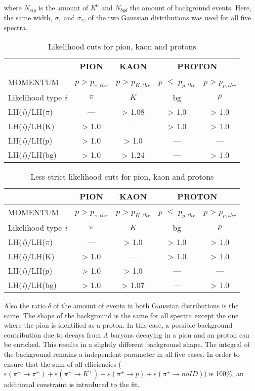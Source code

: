 where $N_{sig}$ is the amount of $K^0$ and $N_{bgd}$ the amount of background events. Here, the same width, $\sigma_1$ and $\sigma_2$, of the two Gaussian distributions
was used for all five spectra.

\begin{table}[h]
  \caption{\label{LHcut} Likelihood cuts for pion, kaon and protons}
  \centering
  \begin{tabular}{lcccc}
    \hline
     & PION & KAON & \multicolumn{2}{c}{PROTON} \\
    \hline
    MOMENTUM & $p$ > $p_{\pi,thr}$ & $p$ > $p_{K,thr}$ & $p$ $\leq$ $p_{p,thr}$ & $p$ > $p_{p,thr}$ \\
    Likelihood type \textit{i} & $\pi$ & $K$ & bg & $p$ \\
    LH(\textit{i})/LH($\pi$) & --- & > 1.08 & > 1.0 & > 1.0 \\
    LH(\textit{i})/LH(K) & > 1.0 & --- & > 1.0 & > 1.0 \\
    LH(\textit{i})/LH($p$) & > 1.0 & > 1.0 & --- & --- \\
    LH(\textit{i})/LH(bg) & > 1.0 & > 1.24 & --- & > 1.0 \\
    \hline
  \end{tabular}
\end{table}

\begin{table}[]
  \caption{\label{LHlessstrict} Less strict likelihood cuts for pion, kaon and protons}
  \centering
  \begin{tabular}{lcccc}
    \hline
     & PION & KAON & \multicolumn{2}{c}{PROTON} \\
    \hline
    MOMENTUM & $p$ > $p_{\pi,thr}$ & $p$ > $p_{K,thr}$ & $p$ $\leq$ $p_{p,thr}$ & $p$ > $p_{p,thr}$ \\
    Likelihood type \textit{i} & $\pi$ & $K$ & bg & $p$ \\
    LH(\textit{i})/LH($\pi$) & --- & > 1.0 & > 1.0 & > 1.0 \\
    LH(\textit{i})/LH(K) & > 1.0 & --- & > 1.0 & > 1.0 \\
    LH(\textit{i})/LH($p$) & > 1.0 & > 1.0 & --- & --- \\
    LH(\textit{i})/LH(bg) & > 1.0 & > 1.07 & --- & > 1.0 \\
    \hline
  \end{tabular}
\end{table}

Also the ratio $\delta$ of the amount of events in both Gaussian distributions is the same. The shape of the background is the same for all spectra except the one where the pion
is identified as a proton. In this case, a possible background contribution due to decays from $\Lambda$ baryons decaying in a pion and an proton can be enriched. This results in
 a slightly different background shape. The integral of the background remains a independent parameter in all five cases. In order to ensure that the sum of all efficiencies
 ($\varepsilon(\pi^+ \rightarrow \pi^+)  + \varepsilon(\pi^+ \rightarrow K^+ ) + \varepsilon(\pi^+ \rightarrow p ) + \varepsilon(\pi^+ \rightarrow noID)$) is 100\%, an additional constraint is introduced to the fit.

